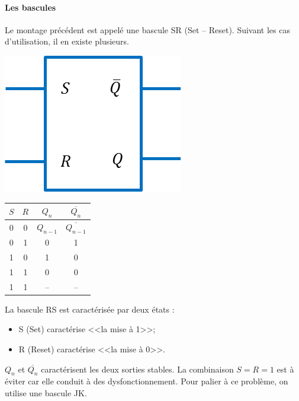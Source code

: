 \documentclass[10pt,fleqn]{article} %
\begin{document}
\paragraph*{Les bascules}
Le montage précédent est appelé une bascule SR (Set -- Reset). Suivant les cas d'utilisation, il en existe plusieurs. 
   
  
\vspace{.2cm}

\begin{minipage}[c]{.15\linewidth}
\begin{center}
\includegraphics[width=\textwidth]{images/basculeRS}
\end{center}
\end{minipage} \hfill
\begin{minipage}[c]{.2\linewidth}
\begin{center}
\begin{tabular}{|c|c||c|c|}
\hline
$S$ & $R$ &  $Q_n$ & $\overline{Q_{n}}$ \\
\hline \hline
0 & 0 & $Q_{n-1}$ & $\overline{Q_{n-1}}$ \\ \hline
0 & 1 & 0 & 1 \\\hline
1 & 0 & 1 & 0 \\\hline
1 & 1 & 0 & 0 \\\hline
1 & 1 & -- & -- \\\hline
\end{tabular}
\end{center}
\end{minipage} \hfill
\begin{minipage}[c]{.53\linewidth}
La bascule RS est caractérisée par deux états : 
\begin{itemize}
\item S (Set) caractérise <<la mise à 1>>;
\item R (Reset) caractérise <<la mise à 0>>.
\end{itemize}

$Q_n$ et $\overline{Q_n}$ caractérisent les deux sorties stables. La combinaison $S=R=1$ est à éviter car elle conduit à des dysfonctionnement. Pour palier à ce problème, on utilise une bascule JK. 
\end{minipage}
   	
\end{document}
